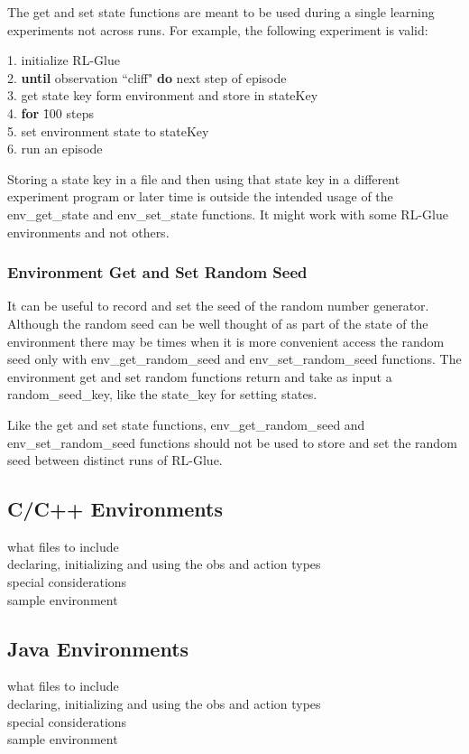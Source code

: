 \documentclass[11pt]{article}
\begin{document}
The get and set state functions are meant to be used during a single learning experiments not across runs. For example, the following experiment is valid:
\begin{tabbing}
1. initialize RL-Glue\\
2. {\bf until} observation ``cliff" {\bf do} next step of episode\\
3. get state key form environment and store in stateKey\\
4. {\bf for} \=100 steps\\
5. \> set environment state to stateKey\\
6. \> run an episode
\end{tabbing}
Storing a state key in a file and then using that state key in a different experiment program or later time is outside the intended usage of the env\_get\_state and env\_set\_state functions. It might work with some RL-Glue environments and not others.
        
\subsubsection{Environment Get and Set Random Seed}
It can be useful to record and set the seed of the random number generator. Although the random seed can be well thought of as part of the state of the environment there may be times when it is more convenient access the random seed only with env\_get\_random\_seed and env\_set\_random\_seed functions. The environment get and set random functions return and take as input a random\_seed\_key, like the state\_key for setting states. 

Like the get and set state functions, env\_get\_random\_seed and env\_set\_random\_seed functions should not be used to store and set the random seed between distinct runs of RL-Glue.

\subsection{C/C++ Environments}
what files to include\\
declaring, initializing and using the obs and action types\\
special considerations\\
sample environment\\


\subsection{Java Environments}
what files to include\\
declaring, initializing and using the obs and action types\\
special considerations\\
sample environment\\
\end{document}

